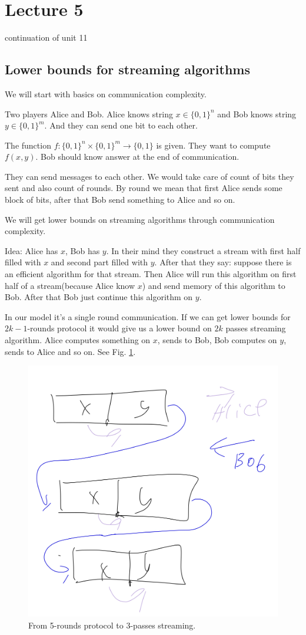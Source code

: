 \section{Lecture 5}

continuation of unit 11

\subsection{Lower bounds for streaming algorithms}

We will start with basics on communication complexity.

\begin{df}
	Two players Alice and Bob. Alice knows string $x \in \{0, 1\}^n$ and Bob knows string $y \in \{0, 1\}^m$. And they can send one bit to each other. 
	
	The function $f \colon \{0, 1\}^n \times \{0, 1\}^m \to \{0, 1\}$ is given. They want to compute $f(x, y)$. Bob should know answer at the end of communication.
	
	They can send messages to each other. 
	We would take care of count of bits they sent and also count of rounds. By round we mean that first Alice sends some block of bits, after that Bob send something to Alice and so on.
\end{df}

We will get lower bounds on streaming algorithms through communication complexity.

\begin{remrk}
	Idea: Alice has $x$, Bob has $y$.
	In their mind they construct a stream with first half filled with $x$ and second part filled with $y$. After that they say: suppose there is an efficient algorithm for that stream. Then Alice will run this algorithm on first half of a stream(because Alice know $x$) and send memory of this algorithm to Bob. After that Bob just continue this algorithm on $y$.
	
	In our model it's a single round communication. If we can get lower bounds for $2k-1$-rounds protocol it would give us a lower bound on $2k$ passes streaming algorithm.
	Alice computes something on $x$, sends to Bob, Bob computes on $y$, sends to Alice and so on. See Fig. \ref{fig:streaming_to_communication}.


\begin{figure}[H]
\centering
\includegraphics[width=0.4\linewidth]{figures/streaming_to_communication.jpeg}
\caption{From 5-rounds protocol to 3-passes streaming.}
\label{fig:streaming_to_communication}
\end{figure}
\end{remrk}


